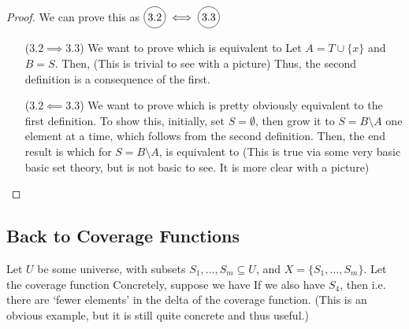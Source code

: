 \begin{proof}
    We can prove this as $\circled{3.2} \iff \circled{3.3}$
    \begin{enumerate}
        \item[($3.2 \implies 3.3$)] We want to prove
            which is equivalent to
            Let $A = T \cup \{ x \}$ and $B = S$. Then,
            (This is trivial to see with a picture) Thus, the second definition is a consequence of the first.
        \item[($3.2 \impliedby 3.3$)] We want to prove
            which is pretty obviously equivalent to the first definition. To show this, initially, set $S = \emptyset$, then grow it to $S = B \setminus A$ one element at a time, which follows from the second definition. Then, the end result is
            which for $S = B \setminus A$, is equivalent to
            (This is true via some very basic basic set theory, but is not basic to see. It is more clear with a picture)
    \end{enumerate}
\end{proof}

\subsection{Back to Coverage Functions}
Let $U$ be some universe, with subsets $S_1, \ldots, S_m \subseteq U$, and $X = \{ S_1, \ldots, S_m \}$. Let the coverage function
Concretely, suppose we have
If we also have $S_4$, then
i.e. there are `fewer elements' in the delta of the coverage function. (This is an obvious example, but it is still quite concrete and thus useful.)


